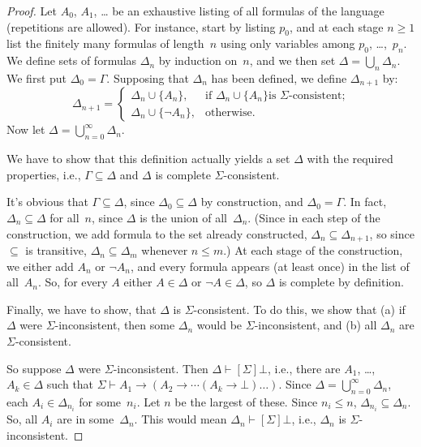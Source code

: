 \documentclass[10pt,a4paper]{article}
\newcommand*{\olup}[1]{#1}   %
\theoremstyle{plain}
\theoremstyle{definition}
\theoremstyle{remark}
\providecommand{\lif}{\mathbin{\rightarrow}}
\providecommand{\lfalse}{\bot}
\providecommand{\Proves}{\mathrel{\vdash}}
\providecommand{\formula}{\relax}
\providecommand{\Obj}{}
\providecommand{\formula}[1]{#1}
\begin{document}
\begin{proof}
Let $A_0$, $A_1$, \dots{} be an exhaustive listing of all formulas
of the language (repetitions are allowed). For instance, start by
listing $\Obj p_0$, and at each stage $n \ge 1$ list the finitely many
formulas of length~$n$ using only variables among $\Obj p_0$,
\dots,~$\Obj p_n$. We define sets of \olup{formula}s $\Delta_n$ by
induction on~$n$, and we then set $\Delta = \bigcup_n \Delta_n$. We
first put $\Delta_0 = \Gamma$. Supposing that $\Delta_n$ has been
defined, we define $\Delta_{n+1}$ by:
\[
\Delta_{n+1} =
\begin{cases}
  \Delta_n \cup \{A_n\}, & \text{if $\Delta_n \cup \{ A_n\}$
    is $\Sigma$-consistent;} \\
  \Delta_n \cup \{ \lnot A_n\}, & \text{otherwise.}
\end{cases}
\]
Now let $\Delta = \bigcup_{n=0}^\infty \Delta_n$.

We have to show that this definition actually yields a set $\Delta$
with the required properties, i.e., $\Gamma \subseteq \Delta$ and
$\Delta$ is complete $\Sigma$-consistent.

It's obvious that $\Gamma \subseteq \Delta$, since $\Delta_0 \subseteq
\Delta$ by construction, and $\Delta_0 = \Gamma$. In fact, $\Delta_n
\subseteq \Delta$ for all~$n$, since $\Delta$ is the union of
all~$\Delta_n$. (Since in each step of the construction, we add
\olup{formula} to the set already constructed, $\Delta_n \subseteq
\Delta_{n+1}$, so since $\subseteq$ is transitive, $\Delta_n \subseteq
\Delta_{m}$ whenever $n \le m$.)  At each stage of the construction, we
either add $A_n$ or $\lnot A_n$, and every \olup{formula} appears (at
least once) in the list of all~$A_n$. So, for every $A$ either $A
\in \Delta$ or $\lnot A \in \Delta$, so $\Delta$ is complete by
definition.

Finally, we have to show, that $\Delta$ is $\Sigma$-consistent.  To do
this, we show that (a) if $\Delta$ were $\Sigma$-inconsistent, then
some $\Delta_n$ would be $\Sigma$-inconsistent, and (b) all $\Delta_n$
are $\Sigma$-consistent.

So suppose $\Delta$ were $\Sigma$-inconsistent. Then $\Delta
\Proves[\Sigma] \lfalse$, i.e., there are $A_1$, \dots,~$A_k \in
\Delta$ such that $\Sigma \Proves A_1 \lif (A_2 \lif \cdots (A_k
\lif \lfalse)\dots)$. Since $\Delta = \bigcup_{n=0}^\infty \Delta_n$, each
$A_i \in \Delta_{n_i}$ for some~$n_i$. Let $n$ be the largest of
these. Since $n_i \le n$, $\Delta_{n_i} \subseteq \Delta_n$. So, all
$A_i$ are in some~$\Delta_n$. This would mean $\Delta_n
\Proves[\Sigma] \lfalse$, i.e., $\Delta_n$ is $\Sigma$-inconsistent.


\end{proof}
\end{document}
